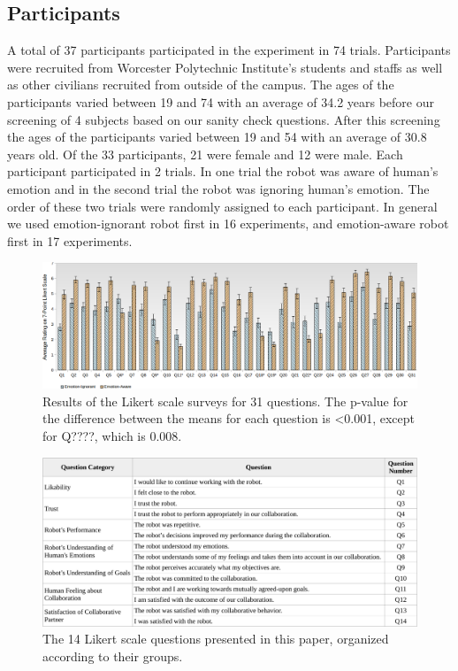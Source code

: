 \documentclass[12pt]{report}
\begin{document}
\vspace*{-5mm}
\subsection{Participants}
\label{sec:Participants}
A total of 37 participants participated in the experiment in 74 trials.
Participants were recruited from Worcester Polytechnic Institute's students and
staffs as well as other civilians recruited from outside of the campus. The ages
of the participants varied between 19 and 74 with an average of 34.2 years
before our screening of 4 subjects based on our sanity check questions. After
this screening the ages of the participants varied between 19 and 54 with an
average of 30.8 years old. Of the 33 participants, 21 were female and 12
were male. Each participant participated in 2 trials. In one trial the robot was
aware of human's emotion and in the second trial the robot was ignoring human's
emotion. The order of these two trials were randomly assigned to each
participant. In general we used emotion-ignorant robot first in 16 experiments,
and emotion-aware robot first in 17 experiments.

\begin{figure}
\centering
\includegraphics[width=1\textwidth]{figure/31questions.png}
\caption{Results of the Likert scale surveys for 31 questions. The p-value for
the difference between the means for each question is <0.001, except for Q????,
which is 0.008.}
\label{fig:31questions}
\end{figure}

\begin{figure}[tbh]
\centering
\includegraphics[width=1\textwidth]{figure/table1-croped.pdf}
\caption{The 14 Likert scale questions presented in this paper, organized
according to their groups.}
\label{fig:31questions-table}
\end{figure}
\end{document}
